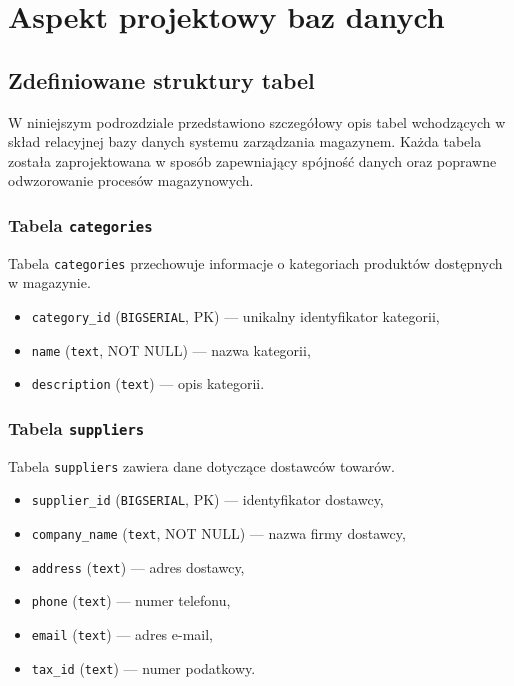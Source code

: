 \chapter{Aspekt projektowy baz danych}


\section{Zdefiniowane struktury tabel}

W niniejszym podrozdziale przedstawiono szczegółowy opis tabel
wchodzących w skład relacyjnej bazy danych systemu zarządzania magazynem.
Każda tabela została zaprojektowana w sposób zapewniający spójność danych
oraz poprawne odwzorowanie procesów magazynowych.

\subsection{Tabela \texttt{categories}}

Tabela \texttt{categories} przechowuje informacje o kategoriach produktów
dostępnych w magazynie.
\begin{itemize}
    \item \texttt{category\_id} (\texttt{BIGSERIAL}, PK) — unikalny identyfikator kategorii,
    \item \texttt{name} (\texttt{text}, NOT NULL) — nazwa kategorii,
    \item \texttt{description} (\texttt{text}) — opis kategorii.
\end{itemize}

\subsection{Tabela \texttt{suppliers}}

Tabela \texttt{suppliers} zawiera dane dotyczące dostawców towarów.
\begin{itemize}
    \item \texttt{supplier\_id} (\texttt{BIGSERIAL}, PK) — identyfikator dostawcy,
    \item \texttt{company\_name} (\texttt{text}, NOT NULL) — nazwa firmy dostawcy,
    \item \texttt{address} (\texttt{text}) — adres dostawcy,
    \item \texttt{phone} (\texttt{text}) — numer telefonu,
    \item \texttt{email} (\texttt{text}) — adres e-mail,
    \item \texttt{tax\_id} (\texttt{text}) — numer podatkowy.
\end{itemize}

